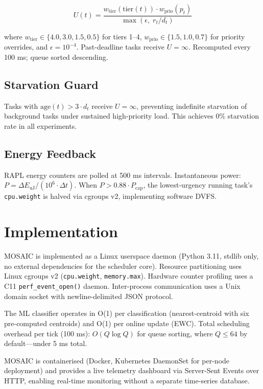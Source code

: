 \documentclass[sigconf,10pt]{acmart}
\newcommand{\sys}{MOSAIC\xspace}
\begin{document}
$$U(t) = \frac{w_\text{tier}(\text{tier}(t)) \cdot w_\text{prio}(p_t)}{\max(\epsilon,\; r_t/d_t)}$$

where $w_\text{tier} \in \{4.0, 3.0, 1.5, 0.5\}$ for tiers 1--4,
$w_\text{prio} \in \{1.5, 1.0, 0.7\}$ for priority overrides,
and $\epsilon = 10^{-4}$. Past-deadline tasks receive $U = \infty$.
Recomputed every 100 ms; queue sorted descending.

\subsection{Starvation Guard}

Tasks with $\text{age}(t) > 3 \cdot d_t$ receive $U = \infty$,
preventing indefinite starvation of background tasks under sustained
high-priority load. This achieves 0\% starvation rate in all experiments.

\subsection{Energy Feedback}

RAPL energy counters are polled at 500 ms intervals.
Instantaneous power: $P = \Delta E_\text{uJ} / (10^6 \cdot \Delta t)$.
When $P > 0.88 \cdot P_\text{cap}$, the lowest-urgency running task's
\texttt{cpu.weight} is halved via cgroups v2, implementing software DVFS.

\section{Implementation}

\sys is implemented as a Linux userspace daemon (Python 3.11, stdlib only,
no external dependencies for the scheduler core). Resource partitioning
uses Linux cgroups v2 (\texttt{cpu.weight}, \texttt{memory.max}). Hardware
counter profiling uses a C11 \texttt{perf\_event\_open()} daemon.
Inter-process communication uses a Unix domain socket with
newline-delimited JSON protocol.

The ML classifier operates in O(1) per classification (nearest-centroid
with six pre-computed centroids) and O(1) per online update (EWC). Total
scheduling overhead per tick (100 ms): $O(Q \log Q)$ for queue sorting,
where $Q \leq 64$ by default—under 5 ms total.

\sys is containerised (Docker, Kubernetes DaemonSet for per-node
deployment) and provides a live telemetry dashboard via Server-Sent Events
over HTTP, enabling real-time monitoring without a separate time-series
database.
\end{document}
